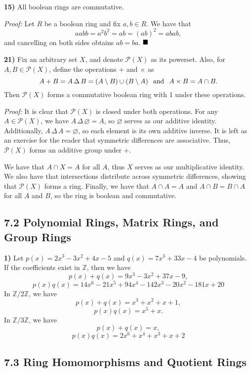 \documentclass[12pt]{article}
\newcommand{\Z}{\mathbb{Z}}
\renewcommand{\t}[1]{\text{#1}}
\newcommand{\symdiff}{\, \Delta \,}
\newcommand{\sdiff}{\setminus}
\newcommand{\proof}{\textit{Proof: }}
\newcommand{\done}{\ensuremath{\strut\hfill\blacksquare}}
\newcommand{\mc}[1]{\ensuremath{\mathcal{#1}}}
\begin{document}
\pagebreak
\textbf{15)}
All boolean rings are commutative.

\proof
Let \( R \) be a boolean ring and fix \( a, b \in R \).
We have that
\[
	aabb = a^2b^2 = ab = (ab)^2 = abab,
\]
and cancelling on both sides obtains \( ab = ba \).
\done

\textbf{21)}
Fix an arbitrary set \( X \), and denote \( \mc{P}(X) \) as its powerset.
Also, for \( A, B \in \mc{P}(X) \), define the operations \( + \) and
\( \times \) as
\[
	A + B = A \symdiff B = (A \sdiff B) \cup (B \sdiff A)
	\hspace{0.1in}
	\t{and}
	\hspace{0.1in}
	A \times B = A \cap B.
\]
Then \( \mc{P}(X) \) forms a commutative boolean ring with 1 under these
operations.

\proof
It is clear that \( \mc{P}(X) \) is closed under both operations.
For any \( A \in \mc{P}(X) \), we have \( A \symdiff \varnothing = A \), so
\( \varnothing \) serves as our additive identity.
Additionally, \( A \symdiff A = \varnothing \), so each element is its own
additive inverse.
It is left as an exercise for the reader that symmetric differences are
associative.
Thus, \( \mc{P}(X) \) forms an additive group under \( + \).

We have that \( A \cap X = A \) for all \( A \), thus \( X \) serves as our
multiplicative identity.
We also have that intersections distribute across symmetric differences,
showing that \( \mc{P}(X) \) forms a ring.
Finally, we have that \( A \cap A = A \) and \( A \cap B = B \cap A \) for
all \( A \) and \( B \), so the ring is boolean and commutative.

\subsection*{7.2 Polynomial Rings, Matrix Rings, and Group Rings}

\textbf{1)}
Let \( p(x) = 2x^3 - 3x^2 + 4x - 5 \) and \( q(x) = 7x^3 + 33x - 4 \) be
polynomials.
If the coefficients exist in \( \Z \), then we have
\[
	p(x) + q(x) = 9x^3 - 3x^2 + 37x - 9,
\]
\[
	p(x)q(x) = 14x^6 - 21x^5 + 94x^4 - 142x^3 - 20x^2 - 181x + 20
\]
In \( \Z/2\Z \), we have
\[
	p(x) + q(x) = x^3 + x^2 + x + 1,
\]
\[
	p(x)q(x) = x^5 + x.
\]
In \( \Z/3\Z \), we have
\[
	p(x) + q(x) = x,
\]
\[
	p(x)q(x) = 2x^6 + x^4 + x^3 + x + 2
\]

\subsection*{7.3 Ring Homomorphisms and Quotient Rings}
\end{document}
